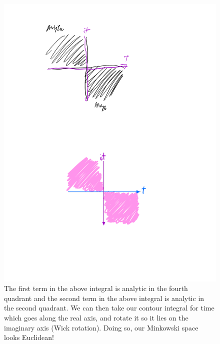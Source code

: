 \begin{figure}[htbp]
    \centering
    \includegraphics[scale=0.8]{Images/fig-analyticregionwickrotation.pdf}
    \caption{The first term in the above integral is analytic in the fourth quadrant and the second term in the above integral is analytic in the second quadrant. We can then take our contour integral for time which goes along the real axis, and rotate it so it lies on the imaginary axis (Wick rotation). Doing so, our Minkowski space looks Euclidean!}
    \label{fig-analyticregionwickrotation}
\end{figure}



